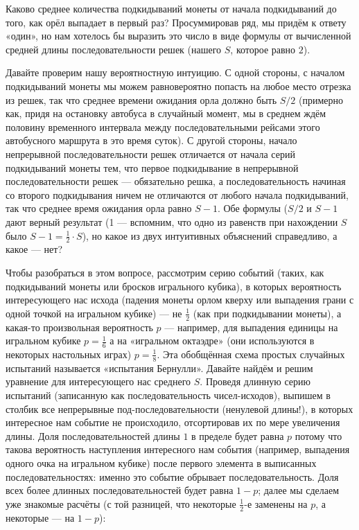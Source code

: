 \documentclass{article}
\begin{document}
Каково среднее количества подкидываний монеты от начала подкидываний до того, как орёл выпадает в первый раз? 
Просуммировав ряд, мы придём к ответу «один», 
но нам хотелось бы выразить это число в виде формулы от вычисленной средней длины последовательности решек (нашего $S$, которое равно $2$). 

Давайте проверим нашу вероятностную интуицию. 
С одной стороны, с началом подкидываний монеты мы можем равновероятно попасть на любое место отрезка из решек, 
так что среднее времени ожидания орла должно быть $S/2$ 
(примерно как, придя на остановку автобуса в случайный момент, мы в среднем ждём половину временного интервала между последовательными рейсами этого автобусного маршрута в это время суток). 
С другой стороны, начало непрерывной последовательности решек отличается от начала серий подкидываний монеты тем, что первое подкидывание в непрерывной последовательности решек --- обязательно решка, а последовательность начиная со второго подкидывания ничем не отличаются от любого начала подкидываний, так что среднее время ожидания орла равно $S-1$. 
Обе формулы ($S/2$ и $S-1$ дают верный результат 
(1 --- вспомним, что одно из равенств при нахождении $S$ было $S-1=\tfrac12\cdot S$), 
но какое из двух интуитивных объяснений справедливо, а какое --- нет? 

Чтобы разобраться в этом вопросе, рассмотрим серию событий (таких, как подкидываний монеты или бросков игрального кубика), 
в которых вероятность интересующего нас исхода (падения монеты орлом кверху или выпадения грани с одной точкой на игральном кубике) --- не $\tfrac12$ (как при подкидывании монеты), 
а какая-то произвольная вероятность $p$
--- например, для выпадения единицы на игральном кубике $p=\tfrac16$ а на «игральном октаэдре» (они используются в некоторых настольных играх) $p=\tfrac18$. 
Эта обобщённая схема простых случайных испытаний называется «испытания Бернулли». 
Давайте найдём и решим уравнение для интересующего нас среднего $S$.
Проведя длинную серию испытаний (записанную как последовательность чисел-исходов), выпишем в столбик все непрерывные под-последовательности (ненулевой длины!), в которых интересное нам событие не происходило, отсортировав их по мере увеличения длины. 
Доля последовательностей длины $1$ в пределе будет равна $p$ потому что такова вероятность наступления интересного нам события (например, выпадения одного очка на игральном кубике) после первого элемента в выписанных последовательностях: именно это событие обрывает последовательность.
Доля всех более длинных последовательностей будет равна $1-p$; 
далее мы сделаем уже знакомые расчёты (с той разницей, что некоторые $\tfrac12$-е заменены на $p$, а некоторые --- на $1-p$):
\end{document}
